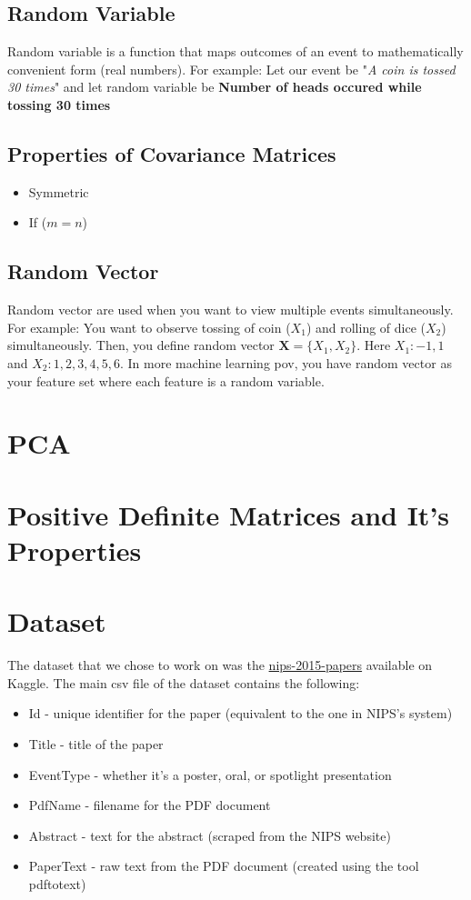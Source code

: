 \subsection{Random Variable}
Random variable is a function that maps outcomes of an event to mathematically convenient form (real numbers). For example: Let our event be "\textit{A coin is tossed 30 times}" and let random variable be \textbf{Number of heads occured while tossing 30 times}

\subsection{Properties of Covariance Matrices}
\begin{itemize}
\item Symmetric
\item If ($m = n$)
\end{itemize}
\subsection{Random Vector}
Random vector are used when you want to view multiple events simultaneously. For example: You want to observe tossing of coin ($X_1$) and rolling of dice ($X_2$) simultaneously. Then, you define random vector $\textbf{X} = \{X_1, X_2\}$. Here $X_1: {-1,1}$ and $X_2: {1,2,3,4,5,6}$. In more machine learning pov, you have random vector as your feature set where each feature is a random variable.


\section{PCA}
\section{Positive Definite Matrices and It's Properties}
\section{Dataset}
The dataset that we chose to work on was the \href{https://www.kaggle.com/benhamner/nips-2015-papers}{nips-2015-papers} available on Kaggle. The main csv file of the dataset contains the following:
\begin{itemize}
\item Id - unique identifier for the paper (equivalent to the one in NIPS's system)
\item Title - title of the paper
\item EventType - whether it's a poster, oral, or spotlight presentation
\item PdfName - filename for the PDF document
\item Abstract - text for the abstract (scraped from the NIPS website)
\item PaperText - raw text from the PDF document (created using the tool pdftotext)
\end{itemize}


